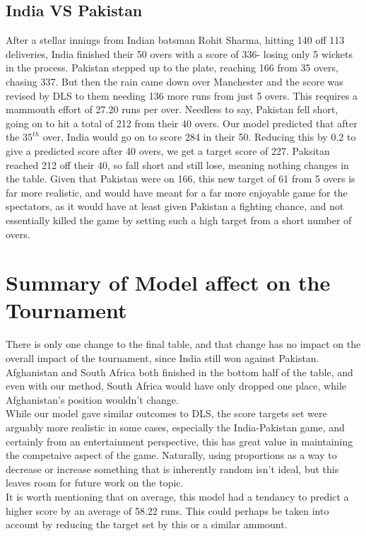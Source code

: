\subsection{India VS Pakistan}
After a stellar innings from Indian batsman Rohit Sharma, hitting 140 off 113 deliveries, India finished their 50 overs with a score of 336- losing only 5 wickets in the process. Pakistan stepped up to the plate, reaching 
166 from 35 overs, chasing 337. But then the rain came down over Manchester and the score was revised by DLS to them needing 136 more runs from just 5 overs. This requires a mammouth effort of 27.20 runs per over. Needless to say,
Pakistan fell short, going on to hit a total of 212 from their 40 overs. Our model predicted that after the $35^{th}$ over, India would go on to score 284 in their 50. Reducing this by 0.2 to give a predicted score after 40 overs, 
we get a target score of 227. Paksitan reached 212 off their 40, so fall short and still lose, meaning nothing changes in the table. Given that Pakistan were on 166, this new target of 61 from 5 overs is far more realistic, and would have 
meant for a far more enjoyable game for the spectators, as it would have at least given Pakistan a fighting chance, and not essentially killed the game by setting such a high target from a short number 
of overs. 

\section{Summary of Model affect on the Tournament}
There is only one change to the final table, and that change has no impact on the overall impact of the tournament, since India still won against Pakistan. Afghanistan and South Africa both finished in the bottom 
half of the table, and even with our method, South Africa would have only dropped one place, while Afghanistan's position wouldn't change. \\

While our model gave similar outcomes to DLS, the score targets set were arguably more realistic in some cases, especially the India-Pakistan game, and certainly from an entertainment perspective, this 
has great value in maintaining the competaive aspect of the game. Naturally, using proportions as a way to decrease or increase something that is inherently random isn't ideal, but this leaves room for future work 
on the topic.  \\

It is worth mentioning that on average, this model had a tendancy to predict a higher score by an average of 58.22 runs. This could perhaps be taken into account by reducing the target set by this or a similar 
ammount. 